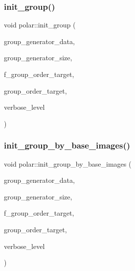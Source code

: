 \subsubsection{\texorpdfstring{init\+\_\+group()}{init\_group()}}
{\footnotesize\ttfamily void polar\+::init\+\_\+group (\begin{DoxyParamCaption}\item[{\mbox{\hyperlink{galois_8h_a09fddde158a3a20bd2dcadb609de11dc}{I\+NT}} $\ast$}]{group\+\_\+generator\+\_\+data,  }\item[{\mbox{\hyperlink{galois_8h_a09fddde158a3a20bd2dcadb609de11dc}{I\+NT}}}]{group\+\_\+generator\+\_\+size,  }\item[{\mbox{\hyperlink{galois_8h_a09fddde158a3a20bd2dcadb609de11dc}{I\+NT}}}]{f\+\_\+group\+\_\+order\+\_\+target,  }\item[{const \mbox{\hyperlink{galois_8h_ab6cc7b4aeb6ea31aba2b3fbfc83ff5e6}{B\+Y\+TE}} $\ast$}]{group\+\_\+order\+\_\+target,  }\item[{\mbox{\hyperlink{galois_8h_a09fddde158a3a20bd2dcadb609de11dc}{I\+NT}}}]{verbose\+\_\+level }\end{DoxyParamCaption})}

\mbox{\label{classpolar_aab2c4c97ea76d9d06cbbbf61dd9e76bd}} 
\subsubsection{\texorpdfstring{init\+\_\+group\+\_\+by\+\_\+base\+\_\+images()}{init\_group\_by\_base\_images()}}
{\footnotesize\ttfamily void polar\+::init\+\_\+group\+\_\+by\+\_\+base\+\_\+images (\begin{DoxyParamCaption}\item[{\mbox{\hyperlink{galois_8h_a09fddde158a3a20bd2dcadb609de11dc}{I\+NT}} $\ast$}]{group\+\_\+generator\+\_\+data,  }\item[{\mbox{\hyperlink{galois_8h_a09fddde158a3a20bd2dcadb609de11dc}{I\+NT}}}]{group\+\_\+generator\+\_\+size,  }\item[{\mbox{\hyperlink{galois_8h_a09fddde158a3a20bd2dcadb609de11dc}{I\+NT}}}]{f\+\_\+group\+\_\+order\+\_\+target,  }\item[{const \mbox{\hyperlink{galois_8h_ab6cc7b4aeb6ea31aba2b3fbfc83ff5e6}{B\+Y\+TE}} $\ast$}]{group\+\_\+order\+\_\+target,  }\item[{\mbox{\hyperlink{galois_8h_a09fddde158a3a20bd2dcadb609de11dc}{I\+NT}}}]{verbose\+\_\+level }\end{DoxyParamCaption})}


